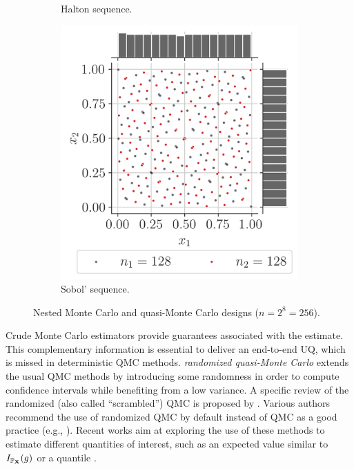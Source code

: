 \begin{figure}[ht]
\begin{subfigure}[b]{0.32\textwidth}
        \caption{Halton sequence.}
    \end{subfigure}
    \hfill
    \begin{subfigure}[b]{0.32\textwidth}
        \centering
        \includegraphics[width=\textwidth]{../numerical_experiments/chapter1/figures/quasi_MonteCarlo_256.png}
        \caption{Sobol' sequence.}
    \end{subfigure}
       \caption{Nested Monte Carlo and quasi-Monte Carlo designs ($n=2^8=256$).}
       \label{fig:quasi_monte_carlo_designs}
\end{figure}

Crude Monte Carlo estimators provide guarantees associated with the estimate. 
This complementary information is essential to deliver an end-to-end UQ, which is missed in deterministic QMC methods.  
\textit{randomized quasi-Monte Carlo} extends the usual QMC methods by introducing some randomness in order to compute confidence intervals while benefiting from a low variance. 
A specific review of the randomized (also called ``scrambled'') QMC is proposed by \citet{lecuyer_2018}. 
Various authors recommend the use of randomized QMC by default instead of QMC as a good practice (e.g., \citealp{owen_2013}). 
Recent works aim at exploring the use of these methods to estimate different quantities of interest, such as an expected value similar to $I_{\mathbb{P}_{{\bf X}}}(g)$ \citep{gobet_2022} or a quantile \citep{tuffin_2019}. 

